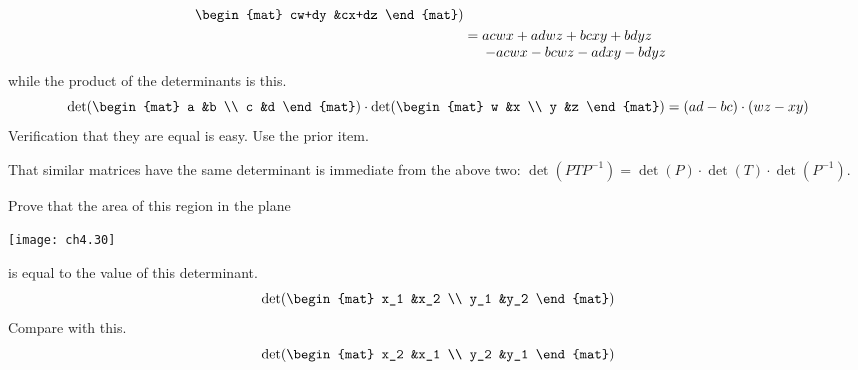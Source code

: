 \begin{exercises}
\begin{answer}
\begin{exparts}
\begin{align*}
\begin{mat}
                 cw+dy  &cx+dz
              \end{mat} )                 \\
             &=
             \begin{array}[t]{@{}l@{}} 
                 acwx+adwz+bcxy+bdyz  \\
                 \> -acwx-bcwz-adxy-bdyz
              \end{array}
          \end{align*}
          while the product of the determinants is this.
          \begin{equation*}
             \det(\begin{mat}
                a  &b  \\
                c  &d
             \end{mat})
             \cdot\det(\begin{mat}
                w  &x  \\
                y  &z
             \end{mat})
             =
             (ad-bc)\cdot (wz-xy)
          \end{equation*}
          Verification that they are equal is easy.
        \partsitem Use the prior item.
       \end{exparts}  
       \noindent That similar matrices have the same determinant 
       is immediate from the above two:
       $
          \det(PTP^{-1})=\det(P)\cdot\det(T)\cdot\det(P^{-1})
       $.
     \end{answer}
  \recommended \item
    Prove that the area of this region in the plane
    \begin{center}
      \texttt{[image: ch4.30]}
    \end{center}
    is equal to the value of this determinant.
    \begin{equation*}
       \det(
       \begin{mat}
          x_1  &x_2  \\
          y_1  &y_2
       \end{mat})
    \end{equation*}
    Compare with this.
    \begin{equation*}
       \det(
       \begin{mat}
          x_2  &x_1  \\
          y_2  &y_1
       \end{mat})
    \end{equation*}
    \begin{answer}

\end{answer}
\end{exercises}
